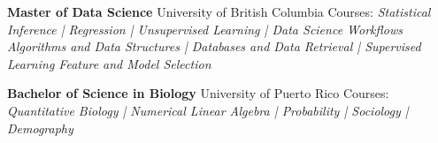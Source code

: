 %
%
%


\begin{scholarship}
					{ \textbf{Master of Data Science} \newline University of British Columbia \newline\newline 
					Courses: \emph{Statistical Inference | Regression | Unsupervised Learning | Data Science Workflows \newline 
					Algorithms and Data Structures | Databases and Data Retrieval | Supervised Learning \newline 
					Feature and Model Selection \newline}}
					
					{ \textbf{Bachelor of Science in Biology} \newline University of Puerto Rico \newline\newline
					Courses: \emph{Quantitative Biology | Numerical Linear Algebra |
					Probability | Sociology | Demography }}
\end{scholarship}